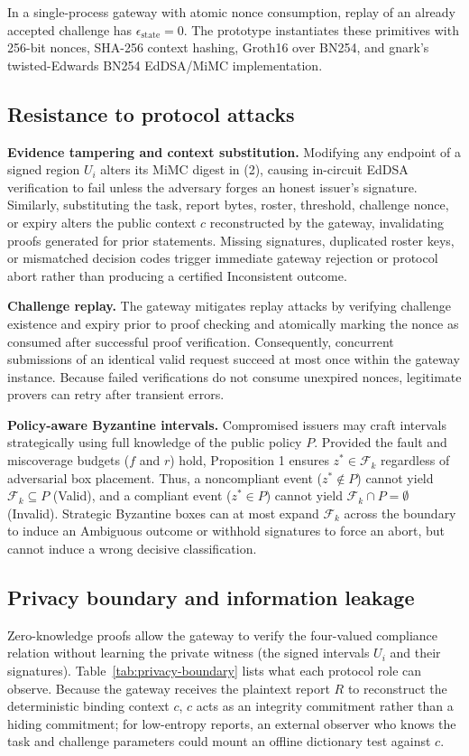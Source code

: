 \documentclass[pdflatex,iicol,sn-mathphys-num]{sn-jnl}
\theoremstyle{thmstyleone}
\begin{document}
In a single-process gateway with atomic nonce consumption, replay of an already accepted challenge has $\epsilon_{\mathrm{state}} = 0$. The prototype instantiates these primitives with 256-bit nonces, SHA-256 context hashing, Groth16 over BN254, and gnark's twisted-Edwards BN254 EdDSA/MiMC implementation.

\subsection{Resistance to protocol attacks}
\textbf{Evidence tampering and context substitution.} Modifying any endpoint of a signed region $U_i$ alters its MiMC digest in (2), causing in-circuit EdDSA verification to fail unless the adversary forges an honest issuer's signature. Similarly, substituting the task, report bytes, roster, threshold, challenge nonce, or expiry alters the public context $c$ reconstructed by the gateway, invalidating proofs generated for prior statements. Missing signatures, duplicated roster keys, or mismatched decision codes trigger immediate gateway rejection or protocol abort rather than producing a certified Inconsistent outcome.

\textbf{Challenge replay.} The gateway mitigates replay attacks by verifying challenge existence and expiry prior to proof checking and atomically marking the nonce as consumed after successful proof verification. Consequently, concurrent submissions of an identical valid request succeed at most once within the gateway instance. Because failed verifications do not consume unexpired nonces, legitimate provers can retry after transient errors.

\textbf{Policy-aware Byzantine intervals.} Compromised issuers may craft intervals strategically using full knowledge of the public policy $P$. Provided the fault and miscoverage budgets ($f$ and $r$) hold, Proposition 1 ensures $z^* \in \mathcal{F}_k$ regardless of adversarial box placement. Thus, a noncompliant event ($z^* \notin P$) cannot yield $\mathcal{F}_k \subseteq P$ (Valid), and a compliant event ($z^* \in P$) cannot yield $\mathcal{F}_k \cap P = \emptyset$ (Invalid). Strategic Byzantine boxes can at most expand $\mathcal{F}_k$ across the boundary to induce an Ambiguous outcome or withhold signatures to force an abort, but cannot induce a wrong decisive classification.

\subsection{Privacy boundary and information leakage}
Zero-knowledge proofs allow the gateway to verify the four-valued compliance relation without learning the private witness (the signed intervals $U_i$ and their signatures). Table~\ref{tab:privacy-boundary} lists what each protocol role can observe. Because the gateway receives the plaintext report $R$ to reconstruct the deterministic binding context $c$, $c$ acts as an integrity commitment rather than a hiding commitment; for low-entropy reports, an external observer who knows the task and challenge parameters could mount an offline dictionary test against $c$.
\end{document}
